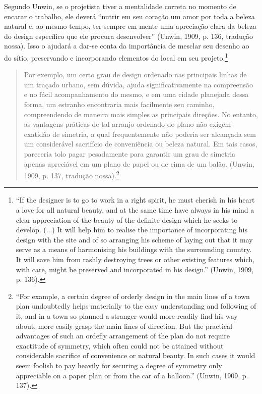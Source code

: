 \documentclass[12pt, a4paper]{book} %
\begin{document}
        Segundo Unwin, se o projetista tiver a mentalidade correta no momento de encarar o trabalho, ele deverá ``nutrir em seu coração um amor por toda a beleza natural e, ao mesmo tempo, ter sempre em mente uma apreciação clara da beleza do design específico que ele procura desenvolver'' (Unwin, 1909, p. 136, tradução nossa). Isso o ajudará a dar-se conta da importância de mesclar seu desenho ao do sítio, preservando e incorporando elementos do local em seu projeto.\footnote[15]{``If the designer is to go to work in a right spirit, he must cherish in his heart a love for all natural beauty, and at the same time have always in his mind a clear appreciation of the beauty of the definite design which he seeks to develop. (...) It will help him to realise the importance of incorporating his design with the site and of so arranging his scheme of laying out that it may serve as a means of harmonising his buildings with the surrounding country. It will save him from rashly destroying trees or other existing features which, with care, might be preserved and incorporated in his design.'' (Unwin, 1909, p. 136).}

        \begin{quotation}
            Por exemplo, um certo grau de design ordenado nas  principais linhas de um traçado urbano, sem dúvida, ajuda significativamente na compreensão e no fácil acompanhamento do mesmo, e em uma cidade planejada dessa forma, um estranho encontraria mais facilmente seu caminho, compreendendo de maneira mais simples as principais direções. No entanto, as vantagens práticas de tal arranjo ordenado do plano não exigem exatidão de simetria, a qual frequentemente não poderia ser alcançada sem um considerável sacrifício de conveniência ou beleza natural. Em tais casos, pareceria tolo pagar pesadamente para garantir um grau de simetria apenas apreciável em um plano de papel ou de cima de um balão. (Unwin, 1909, p. 137, tradução nossa).\footnote[16]{``For example, a certain degree of orderly design in the main lines of a town plan undoubtedly helps materially to the easy understanding and following of it, and in a town so planned a stranger would more readily find his way about, more easily grasp the main lines of direction. But the practical advantages of such an ordefly arrangement of the plan do not require exactitude of symmetry, which often could not be attained without considerable sacrifice of convenience or natural beauty. In such cases it would seem foolish to pay heavily for securing a degree of symmetry only appreciable on a paper plan or from the car of a balloon.'' (Unwin, 1909, p. 137).}
        \end{quotation}
\end{document}
